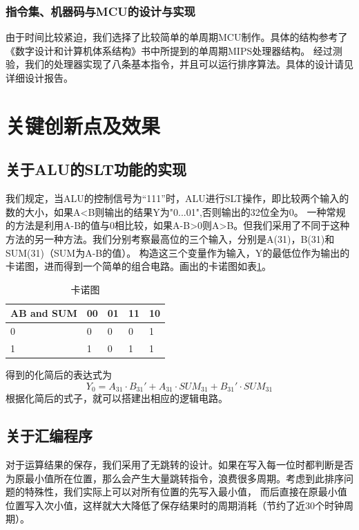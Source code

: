 \documentclass[a4paper]{article}
\begin{document}
			\subsubsection{指令集、机器码与MCU的设计与实现}
				由于时间比较紧迫，我们选择了比较简单的单周期MCU制作。具体的结构参考了《数字设计和计算机体系结构》书中所提到的单周期MIPS处理器结构。
				经过测验，我们的处理器实现了八条基本指令，并且可以运行排序算法。具体的设计请见详细设计报告。
	\section{关键创新点及效果}
		\subsection{关于ALU的SLT功能的实现}
			我们规定，当ALU的控制信号为“111”时，ALU进行SLT操作，即比较两个输入的数的大小，如果A<B则输出的结果Y为"0...01",否则输出的32位全为0。
			一种常规的方法是利用A-B的值与0相比较，如果A-B>0则A>B。但我们采用了不同于这种方法的另一种方法。我们分别考察最高位的三个输入，分别是A(31)，B(31)和SUM(31)（SUM为A-B的值）。
			构造这三个变量作为输入，Y的最低位作为输出的卡诺图，进而得到一个简单的组合电路。画出的卡诺图如表\ref{SLT logic}。\par
			\begin{table}[htbp]
				\centering
				\begin{tabular}{|l|l|l|l|l|}
					\hline
					AB and SUM & 00 & 01 & 11 & 10 \\ \hline
					    0      & 0  & 0  & 0  & 1  \\ \hline
					    1      & 1  & 0  & 1  & 1  \\ \hline
				\end{tabular}
				\caption{卡诺图}
				\label{SLT logic}
			\end{table}
			得到的化简后的表达式为
			\begin{equation}
				Y_0 =A_{31} \cdot B_{31}' +  A_{31} \cdot SUM_{31} + B_{31}' \cdot SUM_{31}
			\end{equation}
			根据化简后的式子，就可以搭建出相应的逻辑电路。
		\subsection{关于汇编程序}
		对于运算结果的保存，我们采用了无跳转的设计。如果在写入每一位时都判断是否为原最小值所在位置，那么会产生大量跳转指令，浪费很多周期。考虑到此排序问题的特殊性，我们实际上可以对所有位置的先写入最小值，
		而后直接在原最小值位置写入次小值，这样就大大降低了保存结果时的周期消耗（节约了近30个时钟周期）。
\end{document}
